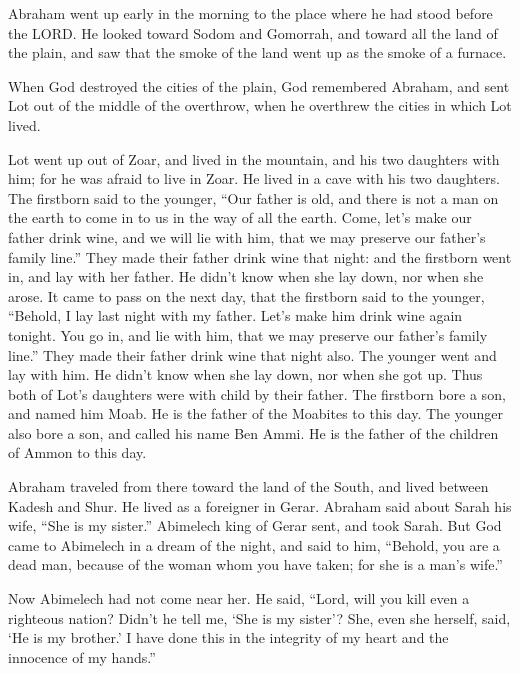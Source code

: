 \myverse{}Abraham went up early in the morning to the place where he had stood before the LORD. \myverse{}He looked toward Sodom and Gomorrah, and toward all the land of the plain, and saw that the smoke of the land went up as the smoke of a furnace.

\myverse{}When God destroyed the cities of the plain, God remembered Abraham, and sent Lot out of the middle of the overthrow, when he overthrew the cities in which Lot lived.

\myverse{}Lot went up out of Zoar, and lived in the mountain, and his two daughters with him; for he was afraid to live in Zoar. He lived in a cave with his two daughters. \myverse{}The firstborn said to the younger, “Our father is old, and there is not a man on the earth to come in to us in the way of all the earth. \myverse{}Come, let’s make our father drink wine, and we will lie with him, that we may preserve our father’s family line.” \myverse{}They made their father drink wine that night: and the firstborn went in, and lay with her father. He didn’t know when she lay down, nor when she arose. \myverse{}It came to pass on the next day, that the firstborn said to the younger, “Behold, I lay last night with my father. Let’s make him drink wine again tonight. You go in, and lie with him, that we may preserve our father’s family line.” \myverse{}They made their father drink wine that night also. The younger went and lay with him. He didn’t know when she lay down, nor when she got up. \myverse{}Thus both of Lot’s daughters were with child by their father. \myverse{}The firstborn bore a son, and named him Moab. He is the father of the Moabites to this day. \myverse{}The younger also bore a son, and called his name Ben Ammi. He is the father of the children of Ammon to this day.

\mychapter{}
\myverse*{}Abraham traveled from there toward the land of the South, and lived between Kadesh and Shur. He lived as a foreigner in Gerar.  \myverse{}Abraham said about Sarah his wife, “She is my sister.” Abimelech king of Gerar sent, and took Sarah.  \myverse{}But God came to Abimelech in a dream of the night, and said to him, “Behold, you are a dead man, because of the woman whom you have taken; for she is a man’s wife.”

\myverse{}Now Abimelech had not come near her. He said, “Lord, will you kill even a righteous nation?  \myverse{}Didn’t he tell me, ‘She is my sister’? She, even she herself, said, ‘He is my brother.’ I have done this in the integrity of my heart and the innocence of my hands.”

